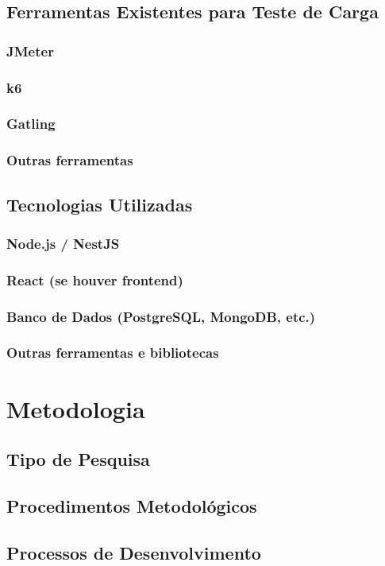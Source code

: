 \documentclass[a4paper,12pt]{article}
\begin{document}
\subsection{Ferramentas Existentes para Teste de Carga}
\subsubsection{JMeter}
\subsubsection{k6}
\subsubsection{Gatling}
\subsubsection{Outras ferramentas}
\subsection{Tecnologias Utilizadas}
\subsubsection{Node.js / NestJS}
\subsubsection{React (se houver frontend)}
\subsubsection{Banco de Dados (PostgreSQL, MongoDB, etc.)}
\subsubsection{Outras ferramentas e bibliotecas}

\section{Metodologia}
\subsection{Tipo de Pesquisa}
\subsection{Procedimentos Metodológicos}
\subsection{Processos de Desenvolvimento}
\end{document}
